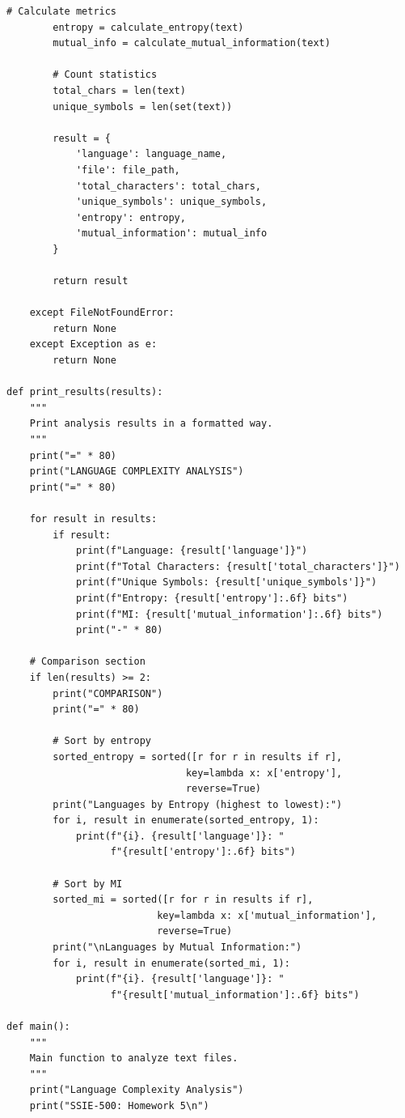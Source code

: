 \documentclass[12pt]{article}
\begin{document}
\begin{lstlisting}[caption={main.py - Language Complexity Analysis Tool}]
        # Calculate metrics
        entropy = calculate_entropy(text)
        mutual_info = calculate_mutual_information(text)
        
        # Count statistics
        total_chars = len(text)
        unique_symbols = len(set(text))
        
        result = {
            'language': language_name,
            'file': file_path,
            'total_characters': total_chars,
            'unique_symbols': unique_symbols,
            'entropy': entropy,
            'mutual_information': mutual_info
        }
        
        return result
        
    except FileNotFoundError:
        return None
    except Exception as e:
        return None

def print_results(results):
    """
    Print analysis results in a formatted way.
    """
    print("=" * 80)
    print("LANGUAGE COMPLEXITY ANALYSIS")
    print("=" * 80)
    
    for result in results:
        if result:
            print(f"Language: {result['language']}")
            print(f"Total Characters: {result['total_characters']}")
            print(f"Unique Symbols: {result['unique_symbols']}")
            print(f"Entropy: {result['entropy']:.6f} bits")
            print(f"MI: {result['mutual_information']:.6f} bits")
            print("-" * 80)
    
    # Comparison section
    if len(results) >= 2:
        print("COMPARISON")
        print("=" * 80)
        
        # Sort by entropy
        sorted_entropy = sorted([r for r in results if r], 
                               key=lambda x: x['entropy'], 
                               reverse=True)
        print("Languages by Entropy (highest to lowest):")
        for i, result in enumerate(sorted_entropy, 1):
            print(f"{i}. {result['language']}: "
                  f"{result['entropy']:.6f} bits")
        
        # Sort by MI
        sorted_mi = sorted([r for r in results if r], 
                          key=lambda x: x['mutual_information'], 
                          reverse=True)
        print("\nLanguages by Mutual Information:")
        for i, result in enumerate(sorted_mi, 1):
            print(f"{i}. {result['language']}: "
                  f"{result['mutual_information']:.6f} bits")

def main():
    """
    Main function to analyze text files.
    """
    print("Language Complexity Analysis")
    print("SSIE-500: Homework 5\n")
    

\end{lstlisting}
\end{document}
